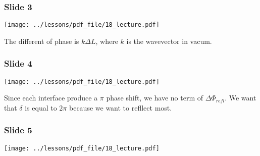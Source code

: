 \documentclass[../main/main.tex]{subfiles}
\begin{document}
\subsubsection*{Slide 3}

\begin{minipage}[]{0.5\linewidth}
\centering
\texttt{[image: ../lessons/pdf\_file/18\_lecture.pdf]}
\end{minipage}
\hspace{0.3cm}\vspace{0.3cm}
\begin{minipage}[c]{0.47\linewidth}

The different of phase is \( k \Delta L \), where \( k \) is the wavevector in vacum.

\end{minipage}

\newpage

\subsubsection*{Slide 4}

\begin{minipage}[]{0.5\linewidth}
\centering
\texttt{[image: ../lessons/pdf\_file/18\_lecture.pdf]}
\end{minipage}
\hspace{0.3cm}\vspace{0.3cm}
\begin{minipage}[c]{0.47\linewidth}

Since each interface produce a \( \pi  \) phase shift, we have no term of \( \Delta \Phi _{refl} \).
We want that \( \delta  \) is equal to \( 2 \pi  \) because we want to refllect most.


\end{minipage}

\subsubsection*{Slide 5}

\begin{minipage}[]{0.5\linewidth}
\centering
\texttt{[image: ../lessons/pdf\_file/18\_lecture.pdf]}
\end{minipage}
\hspace{0.3cm}\vspace{0.3cm}
\begin{minipage}[c]{0.47\linewidth}


\end{minipage}
\end{document}
